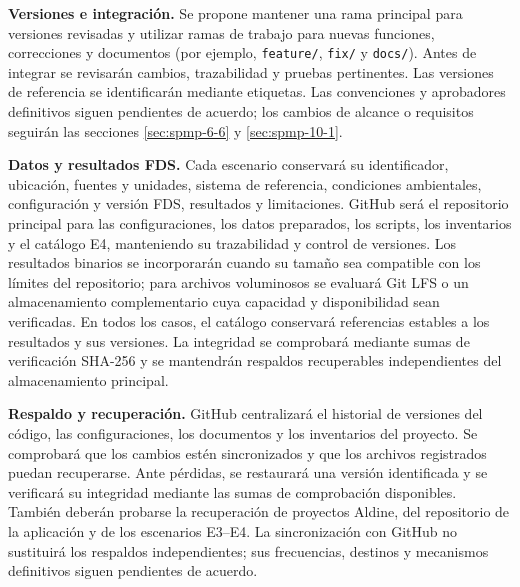 \textbf{Versiones e integración.} Se propone mantener una rama principal para versiones revisadas y utilizar ramas de trabajo para nuevas funciones, correcciones y documentos (por ejemplo, \texttt{feature/}, \texttt{fix/} y \texttt{docs/}). Antes de integrar se revisarán cambios, trazabilidad y pruebas pertinentes. Las versiones de referencia se identificarán mediante etiquetas. Las convenciones y aprobadores definitivos siguen pendientes de acuerdo; los cambios de alcance o requisitos seguirán las secciones \ref{sec:spmp-6-6} y \ref{sec:spmp-10-1}.

\textbf{Datos y resultados FDS.} Cada escenario conservará su identificador, ubicación, fuentes y unidades, sistema de referencia, condiciones ambientales, configuración y versión FDS, resultados y limitaciones. GitHub será el repositorio principal para las configuraciones, los datos preparados, los scripts, los inventarios y el catálogo E4, manteniendo su trazabilidad y control de versiones. Los resultados binarios se incorporarán cuando su tamaño sea compatible con los límites del repositorio; para archivos voluminosos se evaluará Git LFS o un almacenamiento complementario cuya capacidad y disponibilidad sean verificadas. En todos los casos, el catálogo conservará referencias estables a los resultados y sus versiones. La integridad se comprobará mediante sumas de verificación SHA-256 y se mantendrán respaldos recuperables independientes del almacenamiento principal.

\textbf{Respaldo y recuperación.} GitHub centralizará el historial de versiones del código, las configuraciones, los documentos y los inventarios del proyecto. Se comprobará que los cambios estén sincronizados y que los archivos registrados puedan recuperarse. Ante pérdidas, se restaurará una versión identificada y se verificará su integridad mediante las sumas de comprobación disponibles. También deberán probarse la recuperación de proyectos Aldine, del repositorio de la aplicación y de los escenarios E3--E4. La sincronización con GitHub no sustituirá los respaldos independientes; sus frecuencias, destinos y mecanismos definitivos siguen pendientes de acuerdo.
